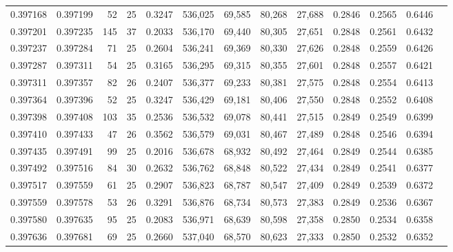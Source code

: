 \begin{tabular}{rrrrrrrrrrrrr}
0.397168 & 0.397199 &    52 &  25 &                                     0.3247 & 536,025 &  69,585 &  80,268 &  27,688 & 0.2846 & 0.2565 & 0.6446 \\
0.397201 & 0.397235 &   145 &  37 &                                     0.2033 & 536,170 &  69,440 &  80,305 &  27,651 & 0.2848 & 0.2561 & 0.6432 \\
0.397237 & 0.397284 &    71 &  25 &                                     0.2604 & 536,241 &  69,369 &  80,330 &  27,626 & 0.2848 & 0.2559 & 0.6426 \\
0.397287 & 0.397311 &    54 &  25 &                                     0.3165 & 536,295 &  69,315 &  80,355 &  27,601 & 0.2848 & 0.2557 & 0.6421 \\
0.397311 & 0.397357 &    82 &  26 &                                     0.2407 & 536,377 &  69,233 &  80,381 &  27,575 & 0.2848 & 0.2554 & 0.6413 \\
0.397364 & 0.397396 &    52 &  25 &                                     0.3247 & 536,429 &  69,181 &  80,406 &  27,550 & 0.2848 & 0.2552 & 0.6408 \\
0.397398 & 0.397408 &   103 &  35 &                                     0.2536 & 536,532 &  69,078 &  80,441 &  27,515 & 0.2849 & 0.2549 & 0.6399 \\
0.397410 & 0.397433 &    47 &  26 &                                     0.3562 & 536,579 &  69,031 &  80,467 &  27,489 & 0.2848 & 0.2546 & 0.6394 \\
0.397435 & 0.397491 &    99 &  25 &                                     0.2016 & 536,678 &  68,932 &  80,492 &  27,464 & 0.2849 & 0.2544 & 0.6385 \\
0.397492 & 0.397516 &    84 &  30 &                                     0.2632 & 536,762 &  68,848 &  80,522 &  27,434 & 0.2849 & 0.2541 & 0.6377 \\
0.397517 & 0.397559 &    61 &  25 &                                     0.2907 & 536,823 &  68,787 &  80,547 &  27,409 & 0.2849 & 0.2539 & 0.6372 \\
0.397559 & 0.397578 &    53 &  26 &                                     0.3291 & 536,876 &  68,734 &  80,573 &  27,383 & 0.2849 & 0.2536 & 0.6367 \\
0.397580 & 0.397635 &    95 &  25 &                                     0.2083 & 536,971 &  68,639 &  80,598 &  27,358 & 0.2850 & 0.2534 & 0.6358 \\
0.397636 & 0.397681 &    69 &  25 &                                     0.2660 & 537,040 &  68,570 &  80,623 &  27,333 & 0.2850 & 0.2532 & 0.6352 \\

\end{tabular}
